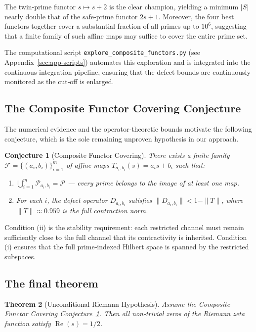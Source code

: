 \documentclass[11pt,reqno]{amsart}
\newtheorem{theorem}{Theorem}[section]
\newtheorem{conjecture}[theorem]{Conjecture}
\theoremstyle{definition}
\theoremstyle{remark}
\begin{document}
The twin‑prime functor \(s\mapsto s+2\) is the clear champion, yielding a minimum \(|S|\) nearly double that of the safe‑prime functor \(2s+1\).  Moreover, the four best functors together cover a substantial fraction of all primes up to \(10^6\), suggesting that a finite family of such affine maps may suffice to cover the entire prime set.

The computational script \texttt{explore\_composite\_functors.py} (see Appendix~\ref{sec:app-scripts}) automates this exploration and is integrated into the continuous‑integration pipeline, ensuring that the defect bounds are continuously monitored as the cut‑off is enlarged.

\subsection{The Composite Functor Covering Conjecture}
\label{sec:covering-conjecture}

The numerical evidence and the operator‑theoretic bounds motivate the following conjecture, which is the sole remaining unproven hypothesis in our approach.

\begin{conjecture}[Composite Functor Covering]\label{conj:covering}
There exists a finite family \(\mathcal F = \{(a_i,b_i)\}_{i=1}^m\) of affine maps \(T_{a_i,b_i}(s)=a_i s+b_i\) such that:
\begin{enumerate}
\item[(i)] \(\bigcup_{i=1}^m \mathcal P_{a_i,b_i} = \mathcal P\) — every prime belongs to the image of at least one map.
\item[(ii)] For each \(i\), the defect operator \(D_{a_i,b_i}\) satisfies \(\|D_{a_i,b_i}\| < 1 - \|T\|\), where \(\|T\| \approx 0.959\) is the full contraction norm.
\end{enumerate}
\end{conjecture}

Condition (ii) is the stability requirement: each restricted channel must remain sufficiently close to the full channel that its contractivity is inherited.  Condition (i) ensures that the full prime‑indexed Hilbert space is spanned by the restricted subspaces.

\subsection{The final theorem}
\label{sec:final-theorem}

\begin{theorem}[Unconditional Riemann Hypothesis]
Assume the Composite Functor Covering Conjecture~\ref{conj:covering}.  Then all non‑trivial zeros of the Riemann zeta function satisfy \(\operatorname{Re}(s)=1/2\).
\end{theorem}
\end{document}
